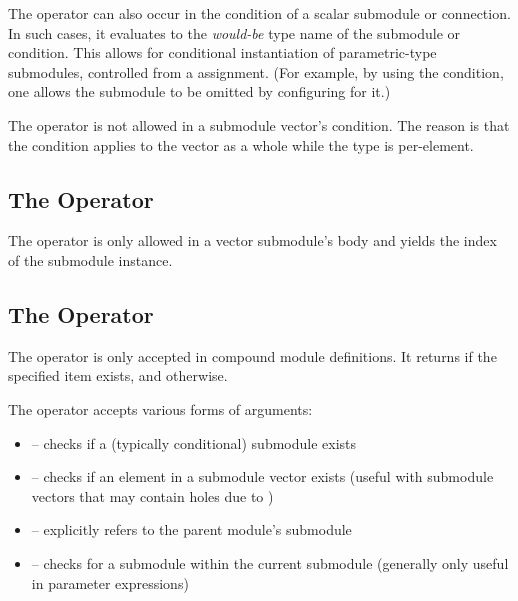 The  operator can also occur in the  condition
of a scalar submodule or connection. In such cases, it evaluates to the
\textit{would-be} type name of the submodule or condition. This allows for
conditional instantiation of parametric-type submodules, controlled from a
 assignment. (For example, by using the  condition, one allows the submodule to be omitted by configuring
 for it.)

The  operator is not allowed in a submodule vector's
 condition. The reason is that the condition applies to the vector
as a whole while the type is per-element.

\subsection{The  Operator}
\label{sec:ned-ref:index-operator}

The  operator is only allowed in a vector submodule's body and
yields the index of the submodule instance.

\subsection{The  Operator}
\label{sec:ned-ref:exists-operator}

The  operator is only accepted in compound module definitions.
It returns  if the specified item exists, and 
otherwise.

The operator accepts various forms of arguments:

\begin{itemize}
  \item {} -- checks if a (typically conditional) submodule exists
  \item {} -- checks if an element in a submodule vector exists
        (useful with submodule vectors that may contain holes due to )
  \item {} -- explicitly refers to the parent module's submodule
  \item {} -- checks for a submodule within the current submodule
        (generally only useful in  parameter expressions)
\end{itemize}


